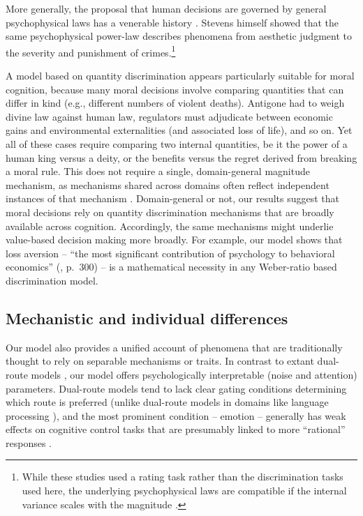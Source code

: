 \documentclass[
]{article}
\begin{document}
More generally, the proposal that human decisions are governed by general psychophysical laws has a venerable history \autocite{Thurstone1954,Stevens1966}. Stevens himself \autocite{Stevens1966} showed that the same psychophysical power-law describes phenomena from aesthetic judgment to the severity and punishment of crimes.\footnote{While these studies used a rating task rather than the discrimination tasks used here, the underlying psychophysical laws are compatible if the internal variance scales with the magnitude \autocite{Zhou2024}.}

A model based on quantity discrimination appears particularly suitable for moral cognition, because many moral decisions involve comparing quantities that can differ in kind (e.g., different numbers of violent deaths). Antigone had to weigh divine law against human law, regulators must adjudicate between economic gains and environmental externalities (and associated loss of life), and so on. Yet all of these cases require comparing two internal quantities, be it the power of a human king versus a deity, or the benefits versus the regret derived from breaking a moral rule. This does not require a single, domain-general magnitude mechanism, as mechanisms shared across domains often reflect independent instances of that mechanism \autocite{Endress-duplications}. Domain-general or not, our results suggest that moral decisions rely on quantity discrimination mechanisms that are broadly available across cognition. Accordingly, the same mechanisms might underlie value-based decision making more broadly. For example, our model shows that loss aversion -- ``the most significant contribution of psychology to behavioral economics'' (\autocite{Kahneman2011}, p.~300) -- is a mathematical necessity in any Weber-ratio based discrimination model.

\subsection{Mechanistic and individual differences}\label{mechanistic-and-individual-differences}

Our model also provides a unified account of phenomena that are traditionally thought to rely on separable mechanisms or traits. In contrast to extant dual-route models \autocite{Greene2001-moral}, our model offers psychologically interpretable (noise and attention) parameters. Dual-route models tend to lack clear gating conditions determining which route is preferred (unlike dual-route models in domains like language processing \autocite{Baayen1997,Pinker1999}), and the most prominent condition -- emotion -- generally has weak effects on cognitive control tasks that are presumably linked to more ``rational'' responses \autocite{Zhang2023}.
\end{document}
